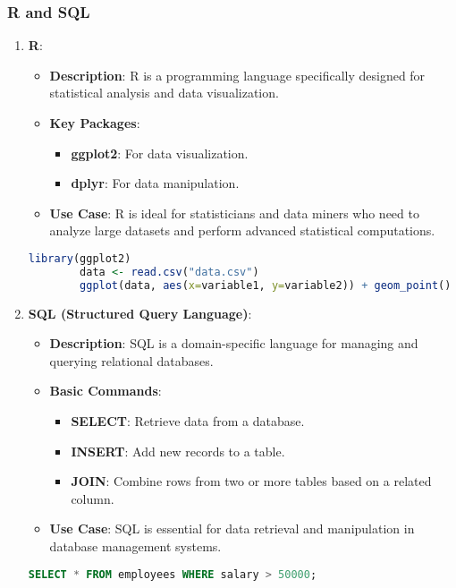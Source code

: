 \documentclass[aspectratio=169]{beamer}
\begin{document}
\begin{frame}[fragile]
    \frametitle{R and SQL}
    \begin{enumerate}
        \item \textbf{R}:
        \begin{itemize}
            \item \textbf{Description}: R is a programming language specifically designed for statistical analysis and data visualization.
            \item \textbf{Key Packages}:
            \begin{itemize}
                \item \textbf{ggplot2}: For data visualization.
                \item \textbf{dplyr}: For data manipulation.
            \end{itemize}
            \item \textbf{Use Case}: R is ideal for statisticians and data miners who need to analyze large datasets and perform advanced statistical computations.
        \end{itemize}

        \begin{lstlisting}[language=R]
        library(ggplot2)
        data <- read.csv("data.csv")
        ggplot(data, aes(x=variable1, y=variable2)) + geom_point()
        \end{lstlisting}

        \item \textbf{SQL (Structured Query Language)}:
        \begin{itemize}
            \item \textbf{Description}: SQL is a domain-specific language for managing and querying relational databases.
            \item \textbf{Basic Commands}:
            \begin{itemize}
                \item \textbf{SELECT}: Retrieve data from a database.
                \item \textbf{INSERT}: Add new records to a table.
                \item \textbf{JOIN}: Combine rows from two or more tables based on a related column.
            \end{itemize}
            \item \textbf{Use Case}: SQL is essential for data retrieval and manipulation in database management systems.
        \end{itemize}
        
        \begin{lstlisting}[language=SQL]
        SELECT * FROM employees WHERE salary > 50000;
        \end{lstlisting}
    \end{enumerate}
\end{frame}
\end{document}
